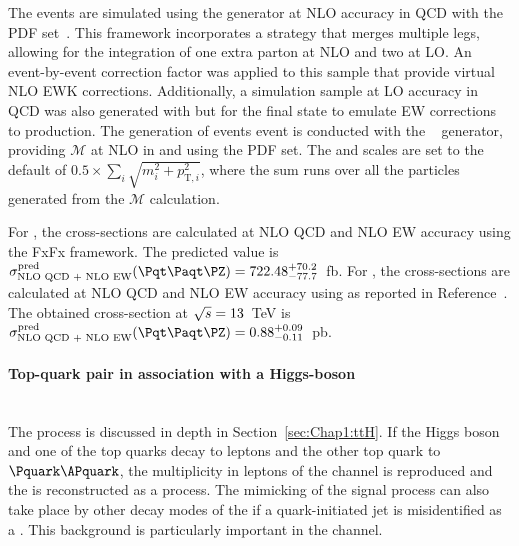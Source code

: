 The \ttW events are simulated using the \SHERPA[2.2.10] generator at 
NLO accuracy in QCD with the \NNPDF[3.0nnlo] PDF set~\cite{Ball:2014uwa}.
This framework incorporates a strategy that merges multiple legs, 
allowing for the integration of one extra parton at NLO and two at LO.
 An event-by-event correction factor was applied to this sample
that provide virtual NLO EWK corrections. 
Additionally, a simulation sample at LO accuracy in
QCD was also generated with \SHERPA[2.2.10] but for the \ttWj final state to emulate
EW corrections to \ttW production.
The generation of \ttZ events event is conducted with 
the \MGNLO[2.3.3]~\cite{Alwall:2014hca} generator, providing $\mathcal{M}$ at
NLO in \alphas and using the \NNPDF[3.0nlo] PDF set. %
The \muR and \muF scales are set to the default of \(0.5 \times \sum_i \sqrt{m^2_i+p^2_{\text{T},i}}\),
where the sum runs over all the particles generated from the  $\mathcal{M}$ calculation.

For \ttW, the cross-sections are calculated at NLO QCD and NLO EW
accuracy using the \MGNLO FxFx framework. The predicted value is
\mbox{$\sigma^{\text{pred}}_{\text{NLO QCD + NLO EW}}(\ttZ) = 722.48^{+70.2}_{-77.7}$~fb.}
For \ttZ, the cross-sections are calculated at NLO QCD and NLO EW accuracy using
\MGNLO as reported in Reference~\cite{LHCHiggsCrossSectionWorkingGroup:2016ypw}.
The obtained cross-section
at \mbox{$\sqrt{s} = 13$~TeV} is \mbox{$\sigma^{\text{pred}}_{\text{NLO QCD + NLO EW}}(\ttZ) = 0.88^{+0.09}_{-0.11}$~pb.}
 


\paragraph{Top-quark pair in association with a Higgs-boson }\mbox{}\\
The \ttH process is discussed in depth in Section~\ref{sec:Chap1:ttH}.
If the Higgs boson and one of the top quarks decay to leptons
and the other top quark to $\Pquark\APquark$, the multiplicity in leptons
of the \dileptau channel is reproduced and the \ttH is reconstructed 
as a \tHq process. The mimicking of the signal process can also
take place by other decay modes of the \ttH if a quark-initiated jet
is misidentified as a \tauhad.
This background is particularly important in the \dilepSStau channel.

